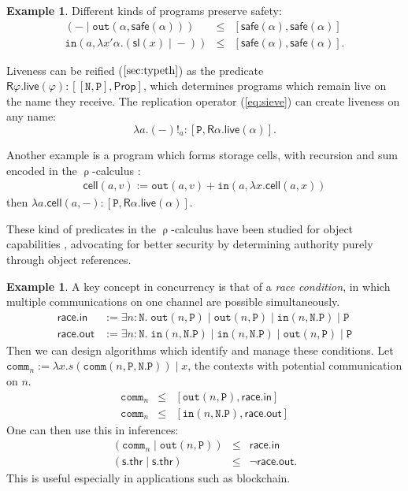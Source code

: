 \documentclass[12pt]{article}
\theoremstyle{definition}
\newtheorem{example}[theorem]{Example}
\newcommand{\msf}[1]{\mathsf{#1}}
\newcommand{\mtt}[1]{\mathtt{#1}}
\newcommand{\Prop}{\msf{Prop}}
\newcommand{\N}{\mtt{N}}
\newcommand{\PP}{\mtt{P}}
\newcommand{\tto}{\mtt{out}}
\newcommand{\tti}{\mtt{in}}
\begin{document}
\begin{example}
    Different kinds of programs preserve safety:
    \[\begin{array}{lcl}
        (- \;|\; \tto(\alpha,\msf{safe}(\alpha))) & \leq & [\msf{safe}(\alpha),\msf{safe}(\alpha)]\\
        \tti(a,\lambda x'\alpha.(\msf{sl}(x) \;|\; -)) & \leq & [\msf{safe}(\alpha),\msf{safe}(\alpha)].
    \end{array}\]
    
    Liveness can be reified ($\ref{sec:typeth}$) as the predicate $\msf{R}\varphi.\msf{live}(\varphi):[[\N,\PP],\Prop]$, which determines programs which remain live on the name they receive. The replication operator (\ref{eq:sieve}) can create liveness on any name:
    \[ \lambda a.(-)!_{a}:[\PP, \msf{R}\alpha.\msf{live}(\alpha)].\]

    Another example is a program which forms storage cells, with recursion and sum encoded in the $\uprho$-calculus \cite{rhocal}:
    \[\begin{array}{c}
        \msf{cell}(a,v):= \tto(a,v) + \tti(a, \lambda x.\msf{cell}(a,x))
    \end{array}\]
    then $\lambda a.\msf{cell}(a,-):[\PP,\msf{R}\alpha.\msf{live}(\alpha)].$
\end{example}
    

These kind of predicates in the $\uprho$-calculus have been studied for object capabilities \cite{ocaps}, advocating for better security by determining authority purely through object references.

\begin{example}
    A key concept in concurrency is that of a \textit{race condition}, in which multiple communications on one channel are possible simultaneously.
    \[\begin{array}{ll}
        \msf{race.in} & := \exists n:\N.\; \tto(n,\PP)\;|\;\tto(n,\PP)\;|\;\tti(n,\N.\PP)\;|\;\PP\\
        \msf{race.out} & := \exists n:\N.\; \tti(n,\N.\PP)\;|\;\tti(n,\N.\PP)\;|\;\tto(n,\PP) \;|\; \PP
    \end{array}\]
    Then we can design algorithms which identify and manage these conditions. Let $\mtt{comm}_n:= \lambda x. s(\mtt{comm}(n,\PP,\N.\PP))\;|\; x$, the contexts with potential communication on $n$.
    \[\begin{array}{lcl}
        \mtt{comm}_n & \leq & [\tto(n,\PP),\msf{race.in}]\\
        \mtt{comm}_n & \leq & [\tti(n,\N.\PP),\msf{race.out}]
    \end{array}\]
    One can then use this in inferences:
    \[\begin{array}{lcl}
         (\mtt{comm}_n \;|\; \tto(n,\PP)) & \leq & \msf{race.in}\\
         (\msf{s.thr} \;|\; \msf{s.thr}) & \leq & \neg\msf{race.out}.
    \end{array}\]
    This is useful especially in applications such as blockchain.
\end{example}
\end{document}
